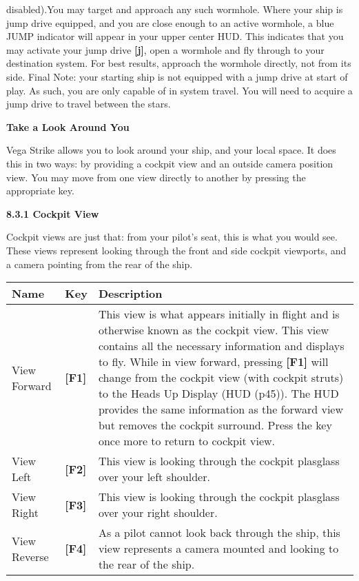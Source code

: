 \documentclass{article}
\begin{document}
disabled).You may target and approach any such wormhole. Where your ship is jump drive equipped, and you are close enough to an active wormhole, a blue JUMP indicator will appear in your upper center HUD. This indicates that you may activate your jump drive \textbf{[j]}, open a wormhole and fly through to your destination system. For best results, approach the wormhole directly, not from its side. Final Note: your starting ship is not equipped with a jump drive at start of play. As such, you are only capable of in system travel. You will need to acquire a jump drive to travel between the stars. 

\textbf{ Take a Look Around You }

Vega Strike allows you to look around your ship, and your local space. It does this in two ways: by providing a cockpit view and an outside camera position view. You may move from one view directly to another by pressing the appropriate key. 

\textbf{8.3.1 Cockpit View }

Cockpit views are just that: from your pilot's seat, this is what you would see. These views represent looking through the front and side cockpit viewports, and a camera pointing from the rear of the ship. 

\begin{tabular}{|p{0.4in}|p{0.3in}|p{4.1in}|} \hline 
\textbf{ Name } & \textbf{Key } & \textbf{Description } \\ \hline 
View Forward  & \textbf{[F1] } & This view is what appears initially in flight and is otherwise known as the cockpit view. This view contains all the necessary information and displays to fly. While in view forward, pressing \textbf{[F1]} will change from the cockpit view (with cockpit struts) to the Heads Up Display (HUD (p45)). The HUD provides the same information as the forward view but removes the cockpit surround. Press the key once more to return to cockpit view.  \\ \hline 
View Left  & \textbf{[F2] } & This view is looking through the cockpit plasglass over your left shoulder.  \\ \hline 
View Right  & \textbf{[F3] } & This view is looking through the cockpit plasglass over your right shoulder.  \\ \hline 
View Reverse  & \textbf{[F4] } & As a pilot cannot look back through the ship, this view represents a camera mounted and looking to the rear of the ship.  \\ \hline 
\end{tabular}
\end{document}
